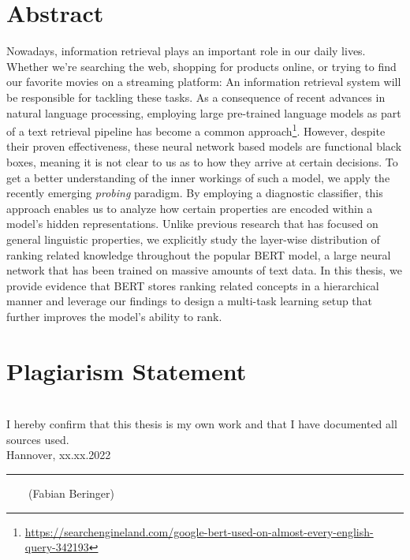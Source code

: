 \documentclass[headsepline]{scrreprt}
\newcommand{\handindate}{xx.xx.2022}
\newcommand{\ti}[1]{\textit{#1}}
\begin{document}


\chapter*{Abstract}
Nowadays, information retrieval plays an important role in our daily lives. Whether we're searching the web, shopping for products online, or trying to find our favorite movies on a streaming platform: An information retrieval system will be responsible for tackling these tasks. As a consequence of recent advances in natural language processing, employing large pre-trained language models as part of a text retrieval pipeline has become a common approach\footnote{\url{https://searchengineland.com/google-bert-used-on-almost-every-english-query-342193}}. However, despite their proven effectiveness, these neural network based models are functional black boxes, meaning it is not clear to us as to how they arrive at certain decisions. To get a better understanding of the inner workings of such a model, we apply the recently emerging \ti{probing} paradigm. By employing a diagnostic classifier, this approach enables us to analyze how certain properties are encoded within a model's hidden representations. Unlike previous research that has focused on general linguistic properties, we explicitly study the layer-wise distribution of ranking related knowledge throughout the popular BERT model, a large neural network that has been trained on massive amounts of text data. In this thesis, we provide evidence that BERT stores ranking related concepts in a hierarchical manner and leverage our findings to design a multi-task learning setup that further improves the model's ability to rank.

\tableofcontents










\chapter*{Plagiarism Statement}
\vfill
\mbox{} \\
{\large I hereby confirm that this thesis is my own work and that I have documented all sources used.}
\newline
\mbox{} \\
Hannover, \handindate \\
\vspace{4cm}
\hrule
\vspace{0.5cm}
$\qquad$(Fabian Beringer)

\listoffigures
{}
\listoftables
{}
\clearpage
{}
{}
\printbibliography
\end{document}
